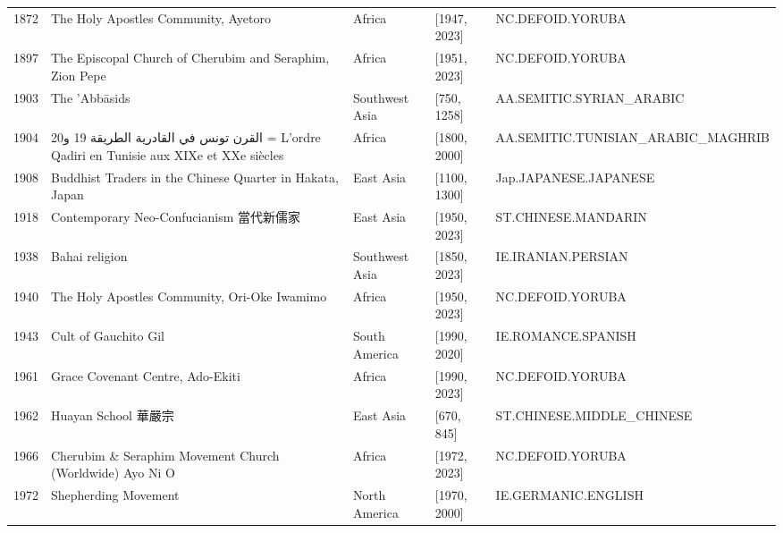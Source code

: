 {\begin{longtable}{rp{3.5cm}llp{3.5cm}}
1872 & {\raggedright The Holy Apostles Community, Ayetoro} & Africa & [1947, 2023] & {\raggedright NC.\allowbreak{}DEFOID.\allowbreak{}YORUBA} \\
1897 & {\raggedright The Episcopal Church of Cherubim and Seraphim, Zion Pepe} & Africa & [1951, 2023] & {\raggedright NC.\allowbreak{}DEFOID.\allowbreak{}YORUBA} \\
1903 & {\raggedright The 'Abbāsids} & Southwest Asia & [750, 1258] & {\raggedright AA.\allowbreak{}SEMITIC.\allowbreak{}SYRIAN\_\allowbreak{}ARABIC} \\
1904 & {\raggedright {\arabicfont القرن تونس في القادرية الطريقة}  19 {\arabicfont و}20   =  L'ordre Qadiri en Tunisie aux XIXe et XXe siècles} & Africa & [1800, 2000] & {\raggedright AA.\allowbreak{}SEMITIC.\allowbreak{}TUNISIAN\_\allowbreak{}ARABIC\_\allowbreak{}MAGHRIB} \\
1908 & {\raggedright Buddhist Traders in the Chinese Quarter in Hakata, Japan} & East Asia & [1100, 1300] & {\raggedright Jap.\allowbreak{}JAPANESE.\allowbreak{}JAPANESE} \\
1918 & {\raggedright Contemporary Neo-Confucianism 當代新儒家} & East Asia & [1950, 2023] & {\raggedright ST.\allowbreak{}CHINESE.\allowbreak{}MANDARIN} \\
1938 & {\raggedright Bahai religion} & Southwest Asia & [1850, 2023] & {\raggedright IE.\allowbreak{}IRANIAN.\allowbreak{}PERSIAN} \\
1940 & {\raggedright The Holy Apostles Community, Ori-Oke Iwamimo} & Africa & [1950, 2023] & {\raggedright NC.\allowbreak{}DEFOID.\allowbreak{}YORUBA} \\
1943 & {\raggedright Cult of Gauchito Gil} & South America & [1990, 2020] & {\raggedright IE.\allowbreak{}ROMANCE.\allowbreak{}SPANISH} \\
1961 & {\raggedright Grace Covenant Centre, Ado-Ekiti} & Africa & [1990, 2023] & {\raggedright NC.\allowbreak{}DEFOID.\allowbreak{}YORUBA} \\
1962 & {\raggedright Huayan School 華嚴宗} & East Asia & [670, 845] & {\raggedright ST.\allowbreak{}CHINESE.\allowbreak{}MIDDLE\_\allowbreak{}CHINESE} \\
1966 & {\raggedright Cherubim \& Seraphim Movement Church (Worldwide) Ayo Ni O} & Africa & [1972, 2023] & {\raggedright NC.\allowbreak{}DEFOID.\allowbreak{}YORUBA} \\
1972 & {\raggedright Shepherding Movement} & North America & [1970, 2000] & {\raggedright IE.\allowbreak{}GERMANIC.\allowbreak{}ENGLISH} \\

\end{longtable}}
